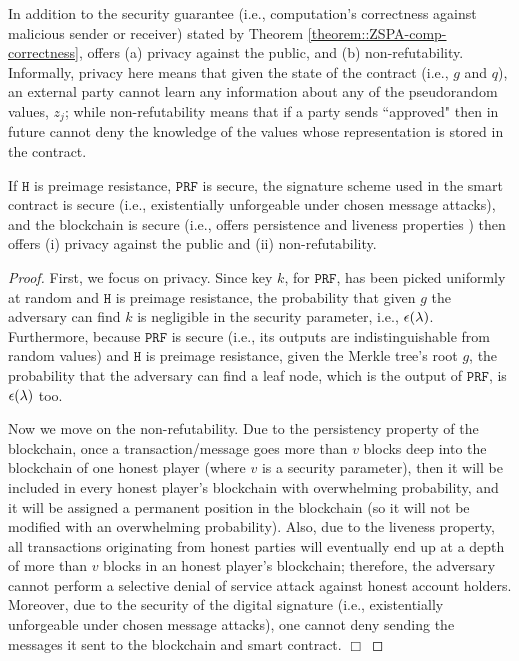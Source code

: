 In addition to the security guarantee (i.e., computation's correctness against malicious sender or receiver) stated by Theorem \ref{theorem::ZSPA-comp-correctness}, \zspa offers  (a) privacy against the public, and (b)  non-refutability. Informally, privacy here means that given the state of the contract (i.e., $g$ and  $q$), an external party cannot learn any information about any of the pseudorandom values,  $z_{\scriptscriptstyle j}$; while non-refutability means that if a party sends ``approved" then in future cannot deny the knowledge of the values whose representation is stored in the contract. %




\begin{theorem}
If  $\mathtt{H}$ is preimage resistance, $\mathtt{PRF}$ is secure, the signature scheme used in the smart contract is secure (i.e., existentially unforgeable under chosen message attacks), and the blockchain is secure (i.e., offers persistence and liveness properties \cite{GarayKL15}) then \zspa offers (i) privacy against the public and (ii) non-refutability. 
\end{theorem}
 
 

\begin{proof}
First, we focus on privacy. Since key $k$, for $\mathtt{PRF}$, has been picked uniformly at random and $\mathtt{H}$ is preimage resistance, the probability that given $g$ the adversary can find $k$ is negligible in the security parameter, i.e., $\epsilon(\lambda)$. Furthermore, because $\mathtt{PRF}$ is secure (i.e., its outputs are indistinguishable from random values) and  $\mathtt{H}$ is preimage resistance, given the Merkle tree's root $g$, the probability that the adversary can find a leaf node, which is the output of $\mathtt{PRF}$, is $\epsilon(\lambda)$ too. 

Now we move on the non-refutability. Due to the persistency property of the blockchain, once a transaction/message goes more than $v$ blocks deep into the blockchain of one honest player (where $v$ is a security parameter), then it will be included in every honest player's blockchain with overwhelming probability, and it will be assigned a permanent
position in the blockchain (so it will not be modified with an overwhelming probability). Also, due to the liveness property,   all transactions originating from honest parties will eventually end up at a depth of more than $v$ blocks in an honest player's blockchain; therefore, the adversary cannot
perform a selective denial of service attack against honest account holders.  Moreover, due to the security of the digital signature (i.e., existentially unforgeable under chosen message attacks), one cannot deny sending the messages it sent to the blockchain and smart contract. 
%
\hfill\(\Box\)
\end{proof}



